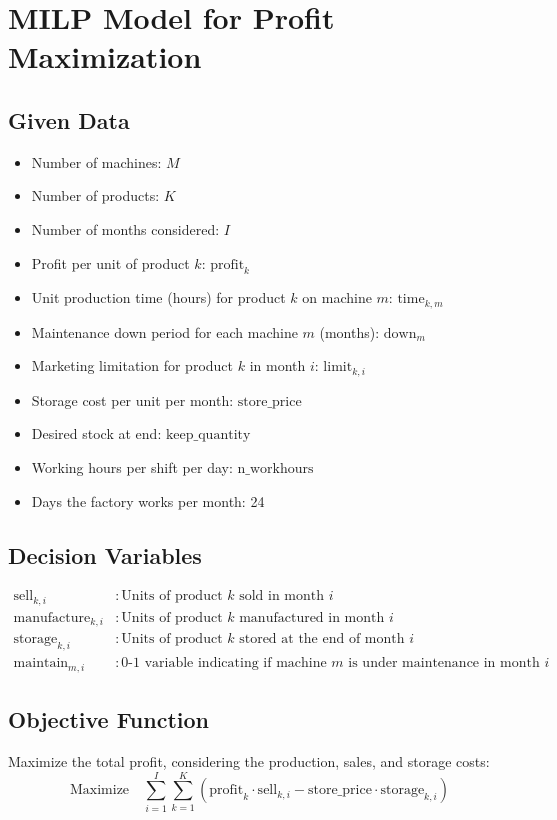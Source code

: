 \documentclass{article}
\begin{document}
\section*{MILP Model for Profit Maximization}

\subsection*{Given Data}
\begin{itemize}
    \item Number of machines: $M$
    \item Number of products: $K$
    \item Number of months considered: $I$
    \item Profit per unit of product $k$: $\text{profit}_k$
    \item Unit production time (hours) for product $k$ on machine $m$: $\text{time}_{k,m}$
    \item Maintenance down period for each machine $m$ (months): $\text{down}_m$
    \item Marketing limitation for product $k$ in month $i$: $\text{limit}_{k,i}$
    \item Storage cost per unit per month: $\text{store\_price}$
    \item Desired stock at end: $\text{keep\_quantity}$
    \item Working hours per shift per day: $\text{n\_workhours}$
    \item Days the factory works per month: 24
\end{itemize}

\subsection*{Decision Variables}
\begin{align*}
    \text{sell}_{k,i} & : \text{Units of product $k$ sold in month $i$} \\
    \text{manufacture}_{k,i} & : \text{Units of product $k$ manufactured in month $i$} \\
    \text{storage}_{k,i} & : \text{Units of product $k$ stored at the end of month $i$} \\
    \text{maintain}_{m,i} & : \text{0-1 variable indicating if machine $m$ is under maintenance in month $i$}
\end{align*}

\subsection*{Objective Function}
Maximize the total profit, considering the production, sales, and storage costs:
\[
\text{Maximize} \quad \sum_{i=1}^{I} \sum_{k=1}^{K} \left( \text{profit}_k \cdot \text{sell}_{k,i} - \text{store\_price} \cdot \text{storage}_{k,i} \right)
\]
\end{document}
